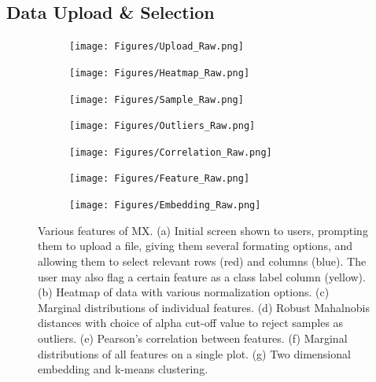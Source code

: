 \documentclass[12pt]{article}
\begin{document}
\subsection{Data Upload \& Selection}
\label{subsec:SubSecUpload}

\begin{figure}
	\centering
	\begin{subfigure}[b]{0.45\textwidth}
		\texttt{[image: Figures/Upload\_Raw.png]}
		\subcaption{}
		\label{fig:FigUpload}
	\end{subfigure}	\hfill
	\begin{subfigure}[b]{0.45\textwidth}
		\texttt{[image: Figures/Heatmap\_Raw.png]}
		\subcaption{}
		\label{fig:FigHeatmap}
	\end{subfigure}	
	\begin{subfigure}[b]{0.45\textwidth}
		\texttt{[image: Figures/Sample\_Raw.png]}
		\subcaption{}
		\label{fig:FigSample}
	\end{subfigure} \hfill
	\begin{subfigure}[b]{0.45\textwidth}
		\texttt{[image: Figures/Outliers\_Raw.png]}
		\subcaption{}
		\label{fig:FigOutliers}
	\end{subfigure}
	\begin{subfigure}[b]{0.45\textwidth}
		\texttt{[image: Figures/Correlation\_Raw.png]}
		\subcaption{}
		\label{fig:FigCorrelation}
	\end{subfigure}\hfill
	\begin{subfigure}[b]{0.45\textwidth}
		\texttt{[image: Figures/Feature\_Raw.png]}
		\subcaption{}
		\label{fig:FigFeature}
	\end{subfigure}
	\begin{subfigure}[b]{0.45\textwidth}
		\texttt{[image: Figures/Embedding\_Raw.png]}
		\subcaption{}
		\label{fig:FigEmbedding}
	\end{subfigure}
	\caption{Various features of MX. (a) Initial screen shown to users, prompting them to upload a file, giving them several formating options, and allowing them to select relevant rows (red) and columns (blue). The user may also flag a certain feature as a class label column (yellow). (b) Heatmap of data with various normalization options. (c) Marginal distributions of individual features. (d) Robust Mahalnobis distances with choice of alpha cut-off value to reject samples as outliers. (e) Pearson's correlation between features. (f) Marginal distributions of all features on a single plot. (g) Two dimensional embedding and k-means clustering.}
\end{figure}
\end{document}

